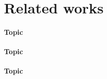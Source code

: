 
\section{Related works}
\label{sec:related}


\paragraph{Topic}
\cite{acne}

\paragraph{Topic}
\cite{nasa}

\paragraph{Topic}
\cite{bspnet}

